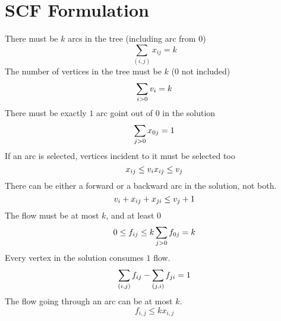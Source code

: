 \documentclass[a4paper]{article}
\numberwithin{equation}{section}
\begin{document}
\section{SCF Formulation}
There must be $k$ arcs in the tree (including arc from $0$)
\begin{equation}
	\sum_{(i,j)} x_{ij} = k
\end{equation}
The number of vertices in the tree must be $k$ ($0$ not included)
\begin{equation}
	\sum_{i>0}v_i =k \\
\end{equation}
There must be exactly $1$ arc goint out of $0$ in the solution
\begin{equation}
	\sum_{j>0} x_{0j}=1\\
\end{equation}
If an arc is selected, vertices incident to it must be selected too
\begin{equation}
	x_{ij} \leq v_i\\
	x_{ij} \leq v_j\\
\end{equation}
There can be either a forward or a backward arc in the solution, not both.
\begin{equation}
	v_i + x_{ij} + x_{ji} \leq v_j + 1\\
\end{equation}
The flow must be at most $k$, and at least $0$
\begin{equation}
	0 \leq f_{ij} \leq k\\
	\sum_{j>0} f_{0j}=k \\
\end{equation}
Every vertex in the solution consumes $1$ flow.
\begin{equation}
	\sum_{(i,j)} f_{ij} - \sum_{(j,i)} f_{ji} = 1\\
\end{equation}
The flow going through an arc can be at most $k$.
\begin{equation}
	f_{i,j}\leq kx_{i,j}
\end{equation}
\end{document}
